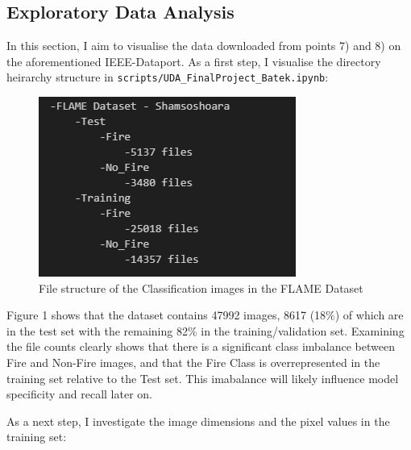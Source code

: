 \documentclass[a4paper,11pt]{article} %
\begin{document}
\subsection{Exploratory Data Analysis}
In this section, I aim to visualise the data downloaded from points 7) and 8) on the aforementioned IEEE-Dataport. As a first step, I visualise the directory
heirarchy structure in \verb!scripts/UDA_FinalProject_Batek.ipynb!:

\begin{figure}[h]
    \includegraphics{../figures/FLAME_dataset_structure.png}
    \caption{File structure of the Classification images in the FLAME Dataset}
\end{figure}

Figure 1 shows that the dataset contains 47992 images, 8617 (18\%) of which are in
the test set with the remaining 82\% in the training\//validation set. Examining the file counts clearly shows that there is a significant class imbalance 
between Fire and Non-Fire images, and that the Fire Class is overrepresented in the training set relative to the Test set. This imabalance will likely
influence model specificity and recall later on.

\medskip

As a next step, I investigate the image dimensions and the pixel values in the training set:
\end{document}
